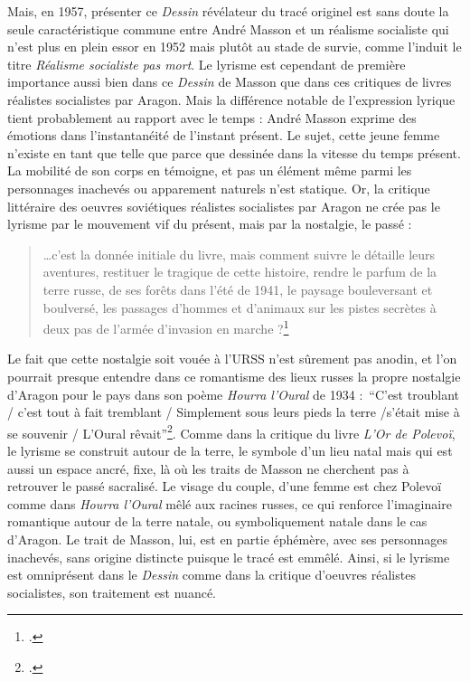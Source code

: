 	Mais, en 1957, présenter ce \emph{Dessin} révélateur du tracé originel est sans doute la seule caractéristique commune entre André Masson et un réalisme socialiste qui n’est plus en plein essor en 1952 mais plutôt au stade de survie, comme l’induit le titre \emph{Réalisme socialiste pas mort}. Le lyrisme est cependant de première importance aussi bien dans ce \emph{Dessin} de Masson que dans ces critiques de livres réalistes socialistes par Aragon. Mais la différence notable de l’expression lyrique tient probablement au rapport avec le temps : André Masson exprime des émotions dans l’instantanéité de l’instant présent. Le sujet, cette jeune femme n’existe en tant que telle que parce que dessinée dans la vitesse du temps présent. La mobilité de son corps en témoigne, et pas un élément même parmi les personnages inachevés ou apparement naturels n’est statique. Or, la critique littéraire des oeuvres soviétiques réalistes socialistes par Aragon ne crée pas le lyrisme par le mouvement vif du présent, mais par la nostalgie, le passé : 

\begin{quote}
…c’est la donnée initiale du livre, mais comment suivre le détaille leurs aventures, restituer le tragique de cette histoire, rendre le parfum de la terre russe, de ses forêts dans l’été de 1941, le paysage bouleversant et boulversé, les passages d’hommes et d’animaux sur les pistes secrètes à deux pas de l’armée d’invasion en marche ?\footcite{realsoc}\end{quote}	


Le fait que cette nostalgie soit vouée à l’URSS n’est sûrement pas anodin, et l’on pourrait presque entendre dans ce romantisme des lieux russes la propre nostalgie d’Aragon pour le pays dans son poème \emph{Hourra l’Oural} de 1934 : \enquote{C’est troublant / c’est tout à fait tremblant / Simplement sous leurs pieds la terre /s’était mise à se souvenir / L’Oural rêvait}\footcite{hourra}. Comme dans la critique du livre \emph{L’Or de Polevoï}, le lyrisme se construit autour de la terre, le symbole d’un lieu natal mais qui est aussi un espace ancré, fixe, là où les traits de Masson ne cherchent pas à retrouver le passé sacralisé. Le visage du couple, d’une femme est chez Polevoï comme dans \emph{Hourra l’Oural} mêlé aux racines russes, ce qui renforce l’imaginaire romantique autour de la terre natale, ou symboliquement natale dans le cas d’Aragon. Le trait de Masson, lui, est en partie éphémère, avec ses personnages inachevés, sans origine distincte puisque le tracé est emmêlé. Ainsi, si le lyrisme est omniprésent dans le \emph{Dessin} comme dans la critique d’oeuvres réalistes socialistes, son traitement est nuancé.


